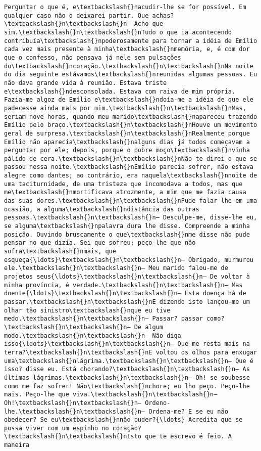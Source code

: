 \documentclass[11pt]{article}
\begin{document}
\begin{Verbatim}[commandchars=\\\{\}]
Perguntar o que é, e\textbackslash{}nacudir-lhe se for possível. Em qualquer caso não o deixarei partir. Que achas?\textbackslash{}n\textbackslash{}n— Acho que sim.\textbackslash{}n\textbackslash{}nTudo o que ia acontecendo contribuía\textbackslash{}npoderosamente para tornar a idéia de Emílio cada vez mais presente à minha\textbackslash{}nmemória, e, é com dor que o confesso, não pensava já nele sem pulsações do\textbackslash{}ncoração.\textbackslash{}n\textbackslash{}nNa noite do dia seguinte estávamos\textbackslash{}nreunidas algumas pessoas. Eu não dava grande vida à reunião. Estava triste e\textbackslash{}ndesconsolada. Estava com raiva de mim própria. Fazia-me algoz de Emílio e\textbackslash{}ndoía-me a idéia de que ele padecesse ainda mais por mim.\textbackslash{}n\textbackslash{}nMas, seriam nove horas, quando meu marido\textbackslash{}napareceu trazendo Emílio pelo braço.\textbackslash{}n\textbackslash{}nHouve um movimento geral de surpresa.\textbackslash{}n\textbackslash{}nRealmente porque Emílio não aparecia\textbackslash{}nalguns dias já todos começavam a perguntar por ele; depois, porque o pobre moço\textbackslash{}nvinha pálido de cera.\textbackslash{}n\textbackslash{}nNão te direi o que se passou nessa noite.\textbackslash{}nEmílio parecia sofrer, não estava alegre como dantes; ao contrário, era naquela\textbackslash{}nnoite de uma taciturnidade, de uma tristeza que incomodava a todos, mas que me\textbackslash{}nmortificava atrozmente, a mim que me fazia causa das suas dores.\textbackslash{}n\textbackslash{}nPude falar-lhe em uma ocasião, a alguma\textbackslash{}ndistância das outras pessoas.\textbackslash{}n\textbackslash{}n— Desculpe-me, disse-lhe eu, se alguma\textbackslash{}npalavra dura lhe disse. Compreende a minha posição. Ouvindo bruscamente o que\textbackslash{}nme disse não pude pensar no que dizia. Sei que sofreu; peço-lhe que não sofra\textbackslash{}nmais, que esqueça{\ldots}\textbackslash{}n\textbackslash{}n— Obrigado, murmurou ele.\textbackslash{}n\textbackslash{}n— Meu marido falou-me de projetos seus{\ldots}\textbackslash{}n\textbackslash{}n— De voltar à minha província, é verdade.\textbackslash{}n\textbackslash{}n— Mas doente{\ldots}\textbackslash{}n\textbackslash{}n— Esta doença há de passar.\textbackslash{}n\textbackslash{}nE dizendo isto lançou-me um olhar tão sinistro\textbackslash{}nque eu tive medo.\textbackslash{}n\textbackslash{}n— Passar? passar como?\textbackslash{}n\textbackslash{}n— De algum modo.\textbackslash{}n\textbackslash{}n— Não diga isso{\ldots}\textbackslash{}n\textbackslash{}n— Que me resta mais na terra?\textbackslash{}n\textbackslash{}nE voltou os olhos para enxugar uma\textbackslash{}nlágrima.\textbackslash{}n\textbackslash{}n— Que é isso? disse eu. Está chorando?\textbackslash{}n\textbackslash{}n— As últimas lágrimas.\textbackslash{}n\textbackslash{}n— Oh! se soubesse como me faz sofrer! Não\textbackslash{}nchore; eu lho peço. Peço-lhe mais. Peço-lhe que viva.\textbackslash{}n\textbackslash{}n— Oh!\textbackslash{}n\textbackslash{}n— Ordeno-lhe.\textbackslash{}n\textbackslash{}n— Ordena-me? E se eu não obedecer? Se eu\textbackslash{}nnão puder?{\ldots} Acredita que se possa viver com um espinho no coração?\textbackslash{}n\textbackslash{}nIsto que te escrevo é feio. A maneira 
\end{Verbatim}
\end{document}
